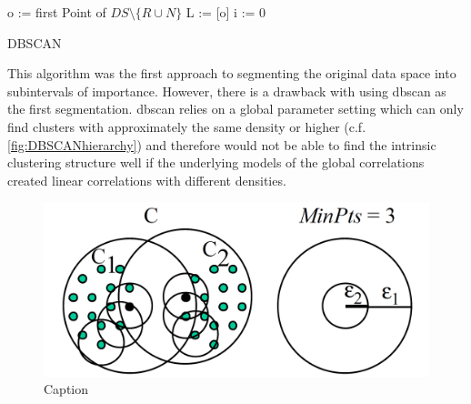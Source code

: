 \vspace{5mm}
\begin{algorithm}[H]
\SetAlgoLined
{}
 o := first Point of $DS\setminus \{R \cup N\}$\;
 L := [o]\;
 i := 0\;
 \caption{DBSCAN}
\end{algorithm}
\vspace{5mm}

This algorithm was the first approach to segmenting the original data space into subintervals of importance. However, there is a drawback with using \gls{dbscan} as the first segmentation. \gls{dbscan} relies on a global parameter setting which can only find clusters with approximately the same density or higher (c.f. \autoref{fig:DBSCANhierarchy}) and therefore would not be able to find the intrinsic clustering structure well if the underlying models of the global correlations created linear correlations with different densities. 

\begin{figure}
    \centering
    \includegraphics[width=.5\textwidth]{figures/DBSCANleastdensity.png}
    \caption{Caption ~\cite{opticsankerst1999optics}}
    \label{fig:DBSCANhierarchy}
\end{figure}

